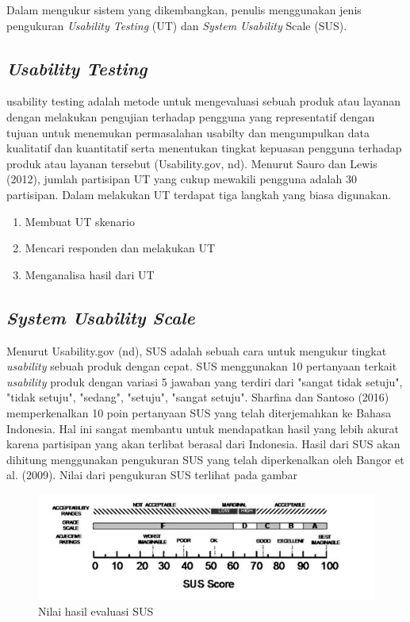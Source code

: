 Dalam mengukur sistem yang dikembangkan, penulis menggunakan jenis pengukuran \textit{Usability Testing} (UT) dan \textit{System Usability} Scale (SUS).
	\subsection{\textit{Usability Testing}}
	usability testing adalah metode untuk mengevaluasi sebuah produk atau layanan dengan melakukan pengujian terhadap pengguna yang representatif dengan tujuan untuk menemukan permasalahan usabilty dan mengumpulkan data kualitatif dan kuantitatif serta menentukan tingkat kepuasan pengguna terhadap produk atau layanan tersebut (Usability.gov, nd).
	\linebreak\linebreak
	Menurut Sauro dan Lewis (2012), jumlah partisipan UT yang cukup mewakili pengguna adalah 30 partisipan. Dalam melakukan UT terdapat tiga langkah yang biasa digunakan.
	\begin{enumerate}
		\item Membuat UT skenario
		\item Mencari responden dan melakukan UT
		\item Menganalisa hasil dari UT
	\end{enumerate}
	 
	\subsection{\textit{System Usability Scale}}
	Menurut Usability.gov (nd), SUS adalah sebuah cara untuk mengukur tingkat \textit{usability} sebuah produk dengan cepat. SUS menggunakan 10 pertanyaan terkait \textit{usability} produk dengan variasi 5 jawaban yang terdiri dari "sangat tidak setuju", "tidak setuju", "sedang", "setuju", "sangat setuju". Sharfina dan Santoso (2016) memperkenalkan 10 poin pertanyaan SUS yang telah diterjemahkan ke Bahasa Indonesia. Hal ini sangat membantu untuk mendapatkan hasil yang lebih akurat karena partisipan yang akan terlibat berasal dari Indonesia.
	\linebreak\linebreak
	Hasil dari SUS akan dihitung menggunakan pengukuran SUS yang telah diperkenalkan oleh Bangor et al. (2009). Nilai dari pengukuran SUS terlihat pada gambar
	\begin{figure}
		\includegraphics{pics/susscore}
		\caption{Nilai hasil evaluasi SUS}
		\centering
	\end{figure}